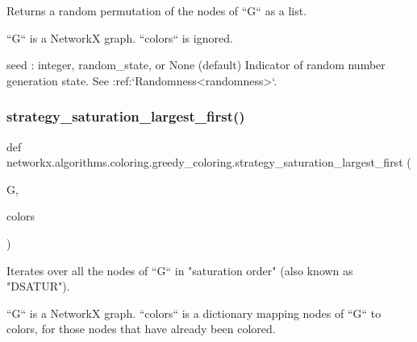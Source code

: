 \begin{DoxyVerb}Returns a random permutation of the nodes of ``G`` as a list.

``G`` is a NetworkX graph. ``colors`` is ignored.

seed : integer, random_state, or None (default)
    Indicator of random number generation state.
    See :ref:`Randomness<randomness>`.
\end{DoxyVerb}
 \mbox{\label{namespacenetworkx_1_1algorithms_1_1coloring_1_1greedy__coloring_aaddf336ba59c8e00684795b4649b769b}} 
\subsubsection{\texorpdfstring{strategy\+\_\+saturation\+\_\+largest\+\_\+first()}{strategy\_saturation\_largest\_first()}}
{\footnotesize\ttfamily def networkx.\+algorithms.\+coloring.\+greedy\+\_\+coloring.\+strategy\+\_\+saturation\+\_\+largest\+\_\+first (\begin{DoxyParamCaption}\item[{}]{G,  }\item[{}]{colors }\end{DoxyParamCaption})}

\begin{DoxyVerb}Iterates over all the nodes of ``G`` in "saturation order" (also
known as "DSATUR").

``G`` is a NetworkX graph. ``colors`` is a dictionary mapping nodes of
``G`` to colors, for those nodes that have already been colored.\end{DoxyVerb}
 \mbox{\label{namespacenetworkx_1_1algorithms_1_1coloring_1_1greedy__coloring_aa8aa245f56f5e4c903b9053479f02b31}} 
